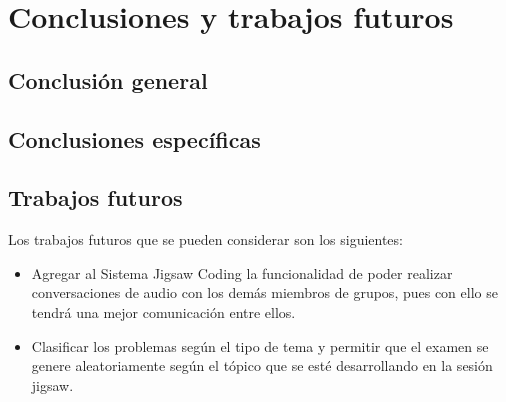 \chapter{Conclusiones y trabajos futuros}
\section{Conclusión general}
\section{Conclusiones específicas}
\section{Trabajos futuros}
Los trabajos futuros que se pueden considerar son los siguientes:

\begin{itemize}
	\item Agregar al Sistema Jigsaw Coding la funcionalidad de poder realizar conversaciones de audio con los demás miembros de grupos, pues con ello se tendrá una mejor comunicación entre ellos.
	\item Clasificar los problemas según el tipo de tema y permitir que el examen se genere aleatoriamente según el tópico que se esté desarrollando en la sesión jigsaw.
\end{itemize}